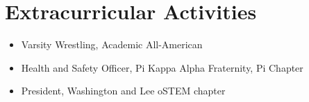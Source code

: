 \section*{Extracurricular Activities}
\begin{itemize}[leftmargin=*]
    \item Varsity Wrestling, Academic All-American
    \item Health and Safety Officer, Pi Kappa Alpha Fraternity, Pi Chapter
    \item President, Washington and Lee oSTEM chapter
\end{itemize}